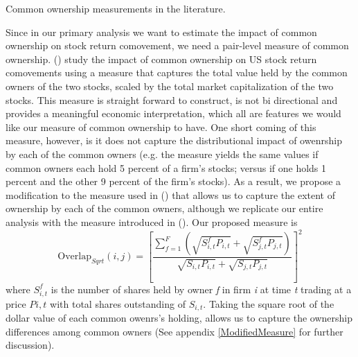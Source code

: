 	{\begin{table}[htbp]
			\centering
			\scriptsize
			\caption{ Common ownership measurements in the literature.}
			\label{maasurmentsSummary}
			\resizebox{\textwidth}{!}{
				
			}
		\end{table}
	}
	
Since in our primary analysis we want to estimate the impact of common ownership on stock return comovement, we need a pair-level measure of common ownership. (\cite{AntonPolk}) study the impact of common ownership on US stock return comovements using a measure that captures the total value held by the common owners of the two stocks, scaled by the total market capitalization of the two stocks. This measure is straight forward to construct, is not bi directional and provides a meaningful economic interpretation, which all are features we would like our measure of common ownership to have. One short coming of this measure, however, is it does not capture the distributional impact of owenrship by each of the common owners (e.g. the measure yields the same values if common owners each hold 5 percent of a firm's stocks; versus if one holds 1 percent and the other 9 percent of the firm's stocks). As a result, we propose a modification to the measure used in (\cite{AntonPolk}) that allows us to capture the extent of ownership by each of the common owners, although we replicate our entire analysis with the measure introduced in (\cite{AntonPolk}). Our proposed measure is
\begin{equation}
	\text{Overlap}_{Sqrt}(i, j) =  [\frac{\sum_{f =1}^{F}(\sqrt{S^f_{i,t}P_{i,t}}+\sqrt{S^f_{j,t}P_{j,t}})}{\sqrt{S_{i,t}P_{i,t}} + \sqrt{S_{j,t}P_{j,t}}}]^2 
	\label{sqrt}
\end{equation}
where $ S^f_{i,t}$ is the number of shares held by owner \textit{f} in firm \textit{i} at time \textit{t} trading at a price $ P{i,t} $ with total shares outstanding of $ S_{i,t} $. Taking the square root of the dollar value of each common owenrs's holding, allows us to capture the ownership differences among common owners ({See appendix \ref{ModifiedMeasure}} for further discussion). 



